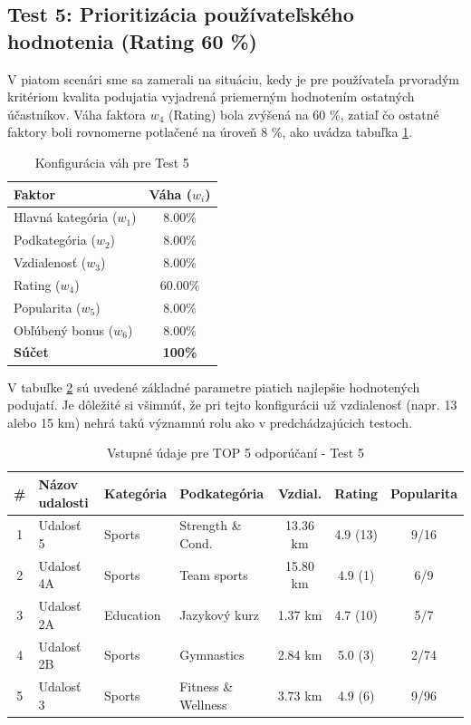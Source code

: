 \subsection{Test 5: Prioritizácia používateľského hodnotenia (Rating 60 \%)}

V piatom scenári sme sa zamerali na situáciu, kedy je pre používateľa prvoradým kritériom kvalita podujatia vyjadrená priemerným hodnotením ostatných účastníkov. Váha faktora $w_4$ (Rating) bola zvýšená na 60 \%, zatiaľ čo ostatné faktory boli rovnomerne potlačené na úroveň 8 \%, ako uvádza tabuľka \ref{tab:vahy_test5}.

\begin{table}[H]
\centering
\begin{tabular}{|l|c|}
\hline
\textbf{Faktor} & \textbf{Váha ($w_i$)} \\
\hline
Hlavná kategória ($w_1$) & 8.00\% \\
Podkategória ($w_2$) & 8.00\% \\
Vzdialenosť ($w_3$) & 8.00\% \\
Rating ($w_4$) & 60.00\% \\
Popularita ($w_5$) & 8.00\% \\
Obľúbený bonus ($w_6$) & 8.00\% \\
\hline
\textbf{Súčet} & \textbf{100\%} \\
\hline
\end{tabular}
\caption{Konfigurácia váh pre Test 5}
\label{tab:vahy_test5}
\end{table}

V tabuľke \ref{tab:data_test5} sú uvedené základné parametre piatich najlepšie hodnotených podujatí. Je dôležité si všimnúť, že pri tejto konfigurácii už vzdialenosť (napr. 13 alebo 15 km) nehrá takú významnú rolu ako v predchádzajúcich testoch.

\begin{table}[H]
\centering
\small
\begin{tabular}{|c|l|l|l|c|c|c|}
\hline
\textbf{\#} & \textbf{Názov udalosti} & \textbf{Kategória} & \textbf{Podkategória} & \textbf{Vzdial.} & \textbf{Rating} & \textbf{Popularita} \\
\hline
1 & Udalosť 5  & Sports    & Strength \& Cond.   & 13.36 km & 4.9 (13) & 9/16 \\
2 & Udalosť 4A & Sports    & Team sports         & 15.80 km & 4.9 (1)  & 6/9 \\
3 & Udalosť 2A & Education & Jazykový kurz       & 1.37 km  & 4.7 (10) & 5/7 \\
4 & Udalosť 2B & Sports    & Gymnastics          & 2.84 km  & 5.0 (3)  & 2/74 \\
5 & Udalosť 3  & Sports    & Fitness \& Wellness & 3.73 km  & 4.9 (6)  & 9/96 \\
\hline
\end{tabular}
\caption{Vstupné údaje pre TOP 5 odporúčaní - Test 5}
\label{tab:data_test5}
\end{table}

